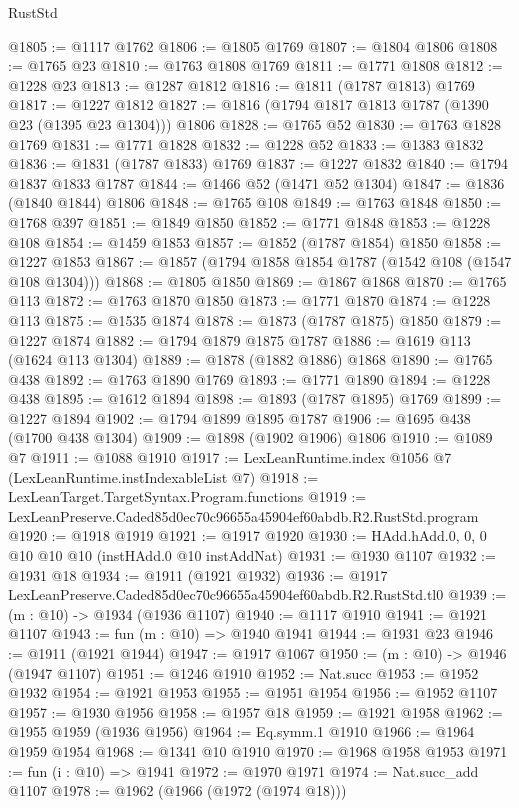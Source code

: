 \begin{lexlean}{RustStd}
\begin{coremodule}
@1805 := @1117 @1762
@1806 := @1805 @1769
@1807 := @1804 @1806
@1808 := @1765 @23
@1810 := @1763 @1808 @1769
@1811 := @1771 @1808
@1812 := @1228 @23
@1813 := @1287 @1812
@1816 := @1811 (@1787 @1813) @1769
@1817 := @1227 @1812
@1827 := @1816 (@1794 @1817 @1813 @1787 (@1390 @23 (@1395 @23 @1304))) @1806
@1828 := @1765 @52
@1830 := @1763 @1828 @1769
@1831 := @1771 @1828
@1832 := @1228 @52
@1833 := @1383 @1832
@1836 := @1831 (@1787 @1833) @1769
@1837 := @1227 @1832
@1840 := @1794 @1837 @1833 @1787
@1844 := @1466 @52 (@1471 @52 @1304)
@1847 := @1836 (@1840 @1844) @1806
@1848 := @1765 @108
@1849 := @1763 @1848
@1850 := @1768 @397
@1851 := @1849 @1850
@1852 := @1771 @1848
@1853 := @1228 @108
@1854 := @1459 @1853
@1857 := @1852 (@1787 @1854) @1850
@1858 := @1227 @1853
@1867 := @1857 (@1794 @1858 @1854 @1787 (@1542 @108 (@1547 @108 @1304)))
@1868 := @1805 @1850
@1869 := @1867 @1868
@1870 := @1765 @113
@1872 := @1763 @1870 @1850
@1873 := @1771 @1870
@1874 := @1228 @113
@1875 := @1535 @1874
@1878 := @1873 (@1787 @1875) @1850
@1879 := @1227 @1874
@1882 := @1794 @1879 @1875 @1787
@1886 := @1619 @113 (@1624 @113 @1304)
@1889 := @1878 (@1882 @1886) @1868
@1890 := @1765 @438
@1892 := @1763 @1890 @1769
@1893 := @1771 @1890
@1894 := @1228 @438
@1895 := @1612 @1894
@1898 := @1893 (@1787 @1895) @1769
@1899 := @1227 @1894
@1902 := @1794 @1899 @1895 @1787
@1906 := @1695 @438 (@1700 @438 @1304)
@1909 := @1898 (@1902 @1906) @1806
@1910 := @1089 @7
@1911 := @1088 @1910
@1917 := LexLeanRuntime.index @1056 @7 (LexLeanRuntime.instIndexableList @7)
@1918 := LexLeanTarget.TargetSyntax.Program.functions
@1919 := LexLeanPreserve.Caded85d0ec70c96655a45904ef60abdb.R2.RustStd.program
@1920 := @1918 @1919
@1921 := @1917 @1920
@1930 := HAdd.hAdd.{0, 0, 0} @10 @10 @10 (instHAdd.{0} @10 instAddNat)
@1931 := @1930 @1107
@1932 := @1931 @18
@1934 := @1911 (@1921 @1932)
@1936 := @1917 LexLeanPreserve.Caded85d0ec70c96655a45904ef60abdb.R2.RustStd.tl0
@1939 := (m : @10) -> @1934 (@1936 @1107)
@1940 := @1117 @1910
@1941 := @1921 @1107
@1943 := fun (m : @10) => @1940 @1941
@1944 := @1931 @23
@1946 := @1911 (@1921 @1944)
@1947 := @1917 @1067
@1950 := (m : @10) -> @1946 (@1947 @1107)
@1951 := @1246 @1910
@1952 := Nat.succ
@1953 := @1952 @1932
@1954 := @1921 @1953
@1955 := @1951 @1954
@1956 := @1952 @1107
@1957 := @1930 @1956
@1958 := @1957 @18
@1959 := @1921 @1958
@1962 := @1955 @1959 (@1936 @1956)
@1964 := Eq.symm.{1} @1910
@1966 := @1964 @1959 @1954
@1968 := @1341 @10 @1910
@1970 := @1968 @1958 @1953
@1971 := fun (i : @10) => @1941
@1972 := @1970 @1971
@1974 := Nat.succ_add @1107
@1978 := @1962 (@1966 (@1972 (@1974 @18)))

\end{coremodule}
\end{lexlean}
